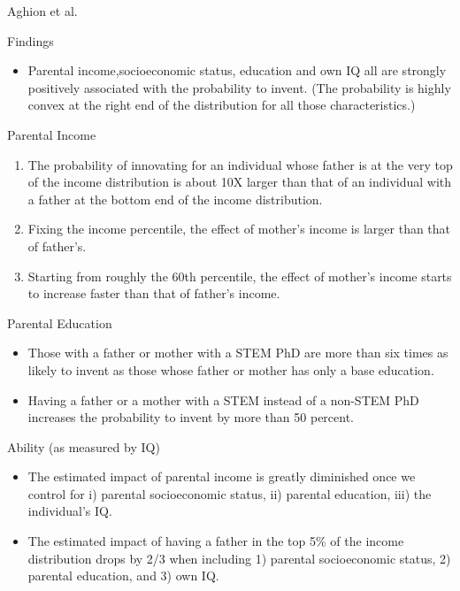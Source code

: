 \begin{frame}{Aghion et al.}

  \begin{block}{Findings}
    \end{block}

  \begin{itemize}

  \item Parental income,socioeconomic status, education and own IQ all are strongly positively associated with the probability to invent. (The probability is highly convex at the right end of the distribution for all those characteristics.)
\end{itemize}
\end{frame}

    \begin{frame}{Parental Income}
      \begin{enumerate}
      \item The probability of innovating for an individual whose father is at the very top of the income distribution is about 10X larger than that of an individual with a father at the bottom end of the income distribution. 
\item Fixing the income percentile, the effect of mother’s income is larger than that of father’s.
\item Starting from roughly the 60th percentile, the effect of mother’s income starts to increase faster than that of father’s income.
      \end{enumerate}
\end{frame}

    \begin{frame}{Parental Education}

      \begin{itemize}
\item Those with a father or mother with a STEM PhD are more than six times as likely to invent as those whose father or mother has only a base education.
\item Having a father or a mother with a STEM instead of a non-STEM PhD increases the probability to invent by more than 50 percent.

      \end{itemize}
    \end{frame}
    
\begin{frame}{Ability (as measured by IQ)}

  \begin{itemize}

\item The estimated impact of parental income is greatly diminished once we control for i) parental socioeconomic status, ii) parental education, iii) the individual’s IQ.
\item The estimated impact of having a father in the top 5\% of the income distribution drops by 2/3 when including 1) parental socioeconomic status, 2) parental education, and 3) own IQ. 

  \end{itemize}
\end{frame}


